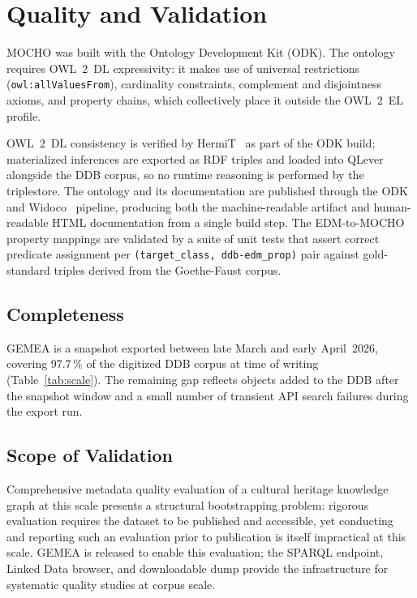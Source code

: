 \section{Quality and Validation}
\label{sec:quality}

MOCHO was built with the Ontology Development Kit (ODK).
The ontology requires OWL~2~DL expressivity: it makes use of universal restrictions
(\texttt{owl:allValuesFrom}), cardinality constraints, complement and disjointness axioms,
and property chains, which collectively place it outside the OWL~2~EL profile.

OWL~2~DL consistency is verified by HermiT~\cite{motik2009hypertableau} as part of the
ODK build; materialized inferences are exported as RDF triples and loaded into QLever
alongside the DDB corpus, so no runtime reasoning is performed by the triplestore.
The ontology and its documentation are published through the ODK and
Widoco~\cite{garijo2017widoco} pipeline, producing both the machine-readable artifact and
human-readable HTML documentation from a single build step.
The EDM-to-MOCHO property mappings are validated by a suite of unit tests that assert
correct predicate assignment per \texttt{(target\_class,~ddb-edm\_prop)} pair against
gold-standard triples derived from the Goethe-Faust corpus.

\subsection{Completeness}
\label{sec:quality:completeness}

GEMEA is a snapshot exported between late March and early April~2026, covering
97.7\,\% of the digitized DDB corpus at time of writing (Table~\ref{tab:scale}).
The remaining gap reflects objects added to the DDB after the snapshot window
and a small number of transient API search failures during the export run.

\subsection{Scope of Validation}
\label{sec:quality:scope}

Comprehensive metadata quality evaluation of a cultural heritage
knowledge graph at this scale presents a structural bootstrapping problem: rigorous evaluation requires
the dataset to be published and accessible, yet conducting and reporting such an evaluation
prior to publication is itself impractical at this scale.
GEMEA is released to enable this evaluation; the SPARQL endpoint, Linked Data browser,
and downloadable dump provide the infrastructure for systematic quality studies at corpus
scale.

